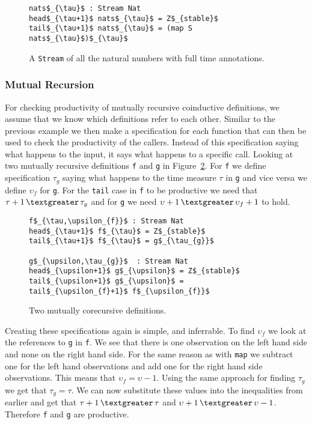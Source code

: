 \begin{figure}
\begin{Verbatim}[commandchars=\\\{\},codes={\catcode`$=3\catcode`_=8}]
nats$_{\tau}$ : Stream Nat
head$_{\tau+1}$ nats$_{\tau}$ = Z$_{stable}$
tail$_{\tau+1}$ nats$_{\tau}$ = (map S nats$_{\tau}$)$_{\tau}$
\end{Verbatim}
\caption{A \texttt{Stream} of all the natural numbers with full time annotations.}
\label{fig:natsComplete}
\end{figure}

\subsubsection{Mutual Recursion}
For checking productivity of mutually recursive coinductive definitions, we assume that we know which definitions refer to each other. Similar to the previous example we then make a specification for each function that can then be used to check the productivity of the callers. Instead of this specification saying what happens to the input, it says what happens to a specific call. Looking at two mutually recursive definitions \texttt{f} and \texttt{g} in Figure~\ref{fig:mutRec1}. For \texttt{f} we define specification $\tau_{g}$ saying what happens to the time measure $\tau$ in \texttt{g} and vice versa we define $\upsilon_{f}$ for \texttt{g}. For the \texttt{tail} case in \texttt{f} to be productive we need that $\tau+1\,\textgreater\,\tau_{g}$ and for \texttt{g} we need $\upsilon+1\,\textgreater\,\upsilon_{f}+1$ to hold.

\begin{figure}
\begin{Verbatim}[commandchars=\\\{\},codes={\catcode`$=3\catcode`_=8}]
f$_{\tau,\upsilon_{f}}$ : Stream Nat
head$_{\tau+1}$ f$_{\tau}$ = Z$_{stable}$
tail$_{\tau+1}$ f$_{\tau}$ = g$_{\tau_{g}}$

g$_{\upsilon,\tau_{g}}$  : Stream Nat
head$_{\upsilon+1}$ g$_{\upsilon}$ = Z$_{stable}$
tail$_{\upsilon+1}$ g$_{\upsilon}$ = tail$_{\upsilon_{f}+1}$ f$_{\upsilon_{f}}$
\end{Verbatim}
\caption{Two mutually corecursive definitions.}
\label{fig:mutRec1}
\end{figure}

Creating these specifications again is simple, and inferrable. To find $\upsilon_{f}$ we look at the references to \texttt{g} in \texttt{f}. We see that there is one observation on the left hand side and none on the right hand side. For the same reason as with \texttt{map} we subtract one for the left hand observations and add one for the right hand side observations. This means that $\upsilon_{f} = \upsilon - 1$. Using the same approach for finding $\tau_{g}$ we get that $\tau_{g} = \tau$. We can now substitute these values into the inequalities from earlier and get that $\tau+1\,\textgreater\,\tau$ and $\upsilon+1\,\textgreater\,\upsilon - 1$. Therefore \texttt{f} and \texttt{g} are productive.


